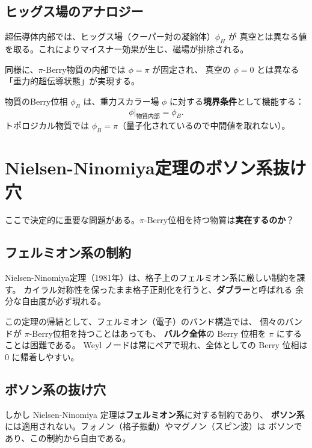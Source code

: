 \subsection{ヒッグス場のアナロジー}

超伝導体内部では、ヒッグス場（クーパー対の凝縮体）$\phi_H$ が
真空とは異なる値を取る。これによりマイスナー効果が生じ、磁場が排除される。

同様に、$\pi$-Berry物質の内部では $\phi = \pi$ が固定され、
真空の $\phi = 0$ とは異なる「重力的超伝導状態」が実現する。

\begin{dfnbox}[境界条件としてのBerry位相]
物質のBerry位相 $\phi_B$ は、重力スカラー場 $\phi$ に対する\textbf{境界条件}として機能する：
\[
  \phi\big|_{\text{物質内部}} = \phi_B.
\]
トポロジカル物質では $\phi_B = \pi$（量子化されているので中間値を取れない）。
\end{dfnbox}

\section{Nielsen-Ninomiya定理のボソン系抜け穴}
\label{sec:11.4}

ここで決定的に重要な問題がある。$\pi$-Berry位相を持つ物質は\textbf{実在するのか}？

\subsection{フェルミオン系の制約}

Nielsen-Ninomiya定理（1981年）は、格子上のフェルミオン系に厳しい制約を課す。
カイラル対称性を保ったまま格子正則化を行うと、\textbf{ダブラー}と呼ばれる
余分な自由度が必ず現れる。

この定理の帰結として、フェルミオン（電子）のバンド構造では、
個々のバンドが $\pi$-Berry位相を持つことはあっても、
\textbf{バルク全体}の Berry 位相を $\pi$ にすることは困難である。
Weyl ノードは常にペアで現れ、全体としての Berry 位相は $0$ に帰着しやすい。

\subsection{ボソン系の抜け穴}

しかし Nielsen-Ninomiya 定理は\textbf{フェルミオン系}に対する制約であり、
\textbf{ボソン系}には適用されない。フォノン（格子振動）やマグノン（スピン波）は
ボソンであり、この制約から自由である。

